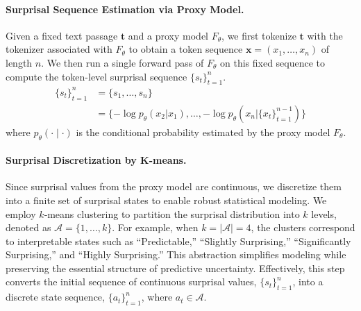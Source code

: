 \documentclass{article}
\theoremstyle{plain}
\theoremstyle{definition}
\theoremstyle{remark}
\begin{document}
\paragraph{Surprisal Sequence Estimation via Proxy Model.}
Given a fixed text passage $\mathbf{t}$ and a proxy model $F_{\theta}$, we first
tokenize $\mathbf{t}$ with the tokenizer associated with $F_{\theta}$ to obtain
a token sequence $\mathbf{x} = (x_1, \dots, x_n)$ of length $n$. We then run a
single forward pass of $F_{\theta}$ on this fixed sequence to compute the
token-level surprisal sequence $\{s_t\}_{t=1}^{n}$.
\begin{align}
    \{s_t\}_{t=1}^{n} &= \{s_1,  \dots, s_n\} \nonumber \\
     &= \{ -\log p_{\theta}(x_2|x_1) ,\dots, -\log p_{\theta}(x_n|\{x_t\}_{t=1}^{n-1})  \} \nonumber 
\end{align}
where $p_\theta(\cdot \mid \cdot)$ is the conditional probability estimated by the proxy model $F_\theta$.
\paragraph{Surprisal Discretization by K-means.}
Since surprisal values from the proxy model are continuous, we discretize them into a finite set of surprisal states to enable robust statistical modeling. We employ $k$‑means clustering to partition the surprisal distribution into $k$ levels, denoted as $\mathcal{A}=\{1,\dots,k\}$. For example, when $k = |\mathcal{A}| = 4$, the clusters correspond to interpretable states such as “Predictable,” “Slightly Surprising,” “Significantly Surprising,” and “Highly Surprising.” This abstraction simplifies modeling while preserving the essential structure of predictive uncertainty. Effectively, this step converts the initial sequence of continuous surprisal values, $ \{s_t\}_{t=1}^{n} $, into a discrete state sequence, $ \{a_t\}_{t=1}^{n} $, where $a_t \in \mathcal{A}$.



\end{document}
